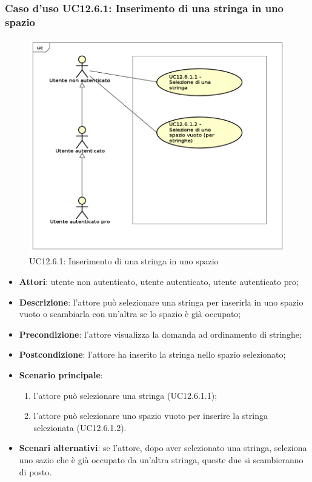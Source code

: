\subsubsection{Caso d'uso UC12.6.1: Inserimento di una stringa in uno spazio}
\label{UC12.6.1}
\begin{figure}[h]
	\centering
	\includegraphics[scale=0.5]{UML/UC12_6_1.png}
	\caption{UC12.6.1: Inserimento di una stringa in uno spazio}
\end{figure}
\begin{itemize}
\item \textbf{Attori}: utente non autenticato, utente autenticato, utente autenticato pro;
\item \textbf{Descrizione}: l'attore può selezionare una stringa per inserirla in uno spazio vuoto o scambiarla con un'altra se lo spazio è già occupato;
\item \textbf{Precondizione}: l'attore visualizza la domanda ad ordinamento di stringhe;
\item \textbf{Postcondizione}: l'attore ha inserito la stringa nello spazio selezionato;
\item \textbf{Scenario principale}: 
\begin{enumerate}
\item l'attore può selezionare una stringa (UC12.6.1.1);
\item l'attore può selezionare uno spazio vuoto per inserire la stringa selezionata (UC12.6.1.2).
\end{enumerate}
\item \textbf{Scenari alternativi}: se l'attore, dopo aver selezionato una stringa, seleziona uno sazio che è già occupato da un'altra stringa, queste due si scambieranno di posto.
\end{itemize}

